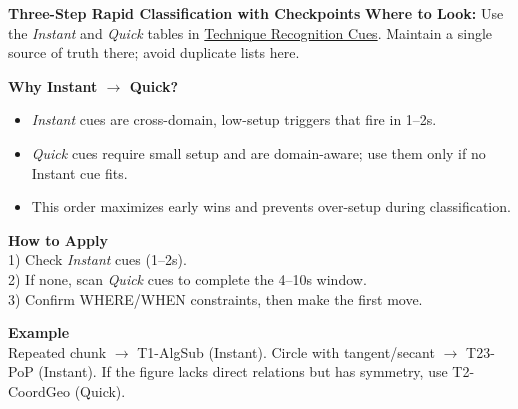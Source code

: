 \documentclass{article}
\newcommand{\immediateaction}[1]{\textbf{\textcolor{classifyred}{#1}}}
\begin{document}
\begin{classifybox}{\immediateaction{Three-Step Rapid Classification with Checkpoints}}
\textbf{Where to Look:} Use the \textit{Instant} and \textit{Quick} tables in \hyperlink{ircues}{Technique Recognition Cues}. Maintain a single source of truth there; avoid duplicate lists here.

\begin{tcolorbox}[colback=blue!5!white,colframe=blue!50!black,title={\textbf{Recognition Tier Priority}}]
\textbf{Why Instant $\rightarrow$ Quick?}\\
\begin{itemize}[nosep]
\item \textit{Instant} cues are cross-domain, low-setup triggers that fire in 1--2s.
\item \textit{Quick} cues require small setup and are domain-aware; use them only if no Instant cue fits.
\item This order maximizes early wins and prevents over-setup during classification.
\end{itemize}

\textbf{How to Apply}\\
1) Check \textit{Instant} cues (1--2s).\\
2) If none, scan \textit{Quick} cues to complete the 4--10s window.\\
3) Confirm WHERE/WHEN constraints, then make the first move.

\textbf{Example}\\
Repeated chunk $\rightarrow$ T1-AlgSub (Instant). Circle with tangent/secant $\rightarrow$ T23-PoP (Instant). If the figure lacks direct relations but has symmetry, use T2-CoordGeo (Quick).
\end{tcolorbox}


\end{classifybox}
\end{document}
